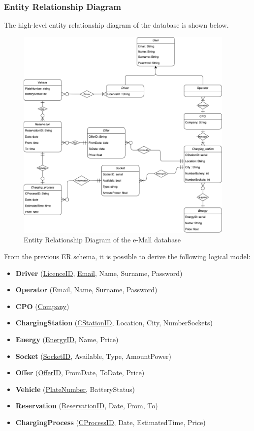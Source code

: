 \documentclass[../main.tex]{subfiles}
\begin{document}
\subsubsection{Entity Relationship Diagram}
The high-level entity relationship diagram of the database is shown below. 
\vspace{3em}
    {\begin{figure}[H]
    \centering
    \includegraphics[width=0.95\textwidth]{images/ERDiagram.png}
    \caption{Entity Relationship Diagram of the e-Mall database}
    \label{fig:er}
    \end{figure}}
    
\newpage
\noindent
From the previous ER schema, it is possible to derive the following logical model: 
\begin{itemize}
    \item [] \textbf{Driver} (\underline{LicenceID}, \underline{Email}, Name, Surname, Password)
    \item [] \textbf{Operator} (\underline{Email}, Name, Surname, Password)
    \item [] \textbf{CPO} (\underline{Company})
    \item [] \textbf{ChargingStation} (\underline{CStationID}, Location, City, NumberSockets)
    \item [] \textbf{Energy} (\underline{EnergyID}, Name, Price)
    \item [] \textbf{Socket} (\underline{SocketID}, Available, Type, AmountPower)
    \item [] \textbf{Offer} (\underline{OfferID}, FromDate, ToDate, Price)
    
    \item [] \textbf{Vehicle} (\underline{PlateNumber}, BatteryStatus)
    \item [] \textbf{Reservation} (\underline{ReservationID}, Date, From, To)
    \item [] \textbf{ChargingProcess} (\underline{CProcessID}, Date, EstimatedTime, Price)
\end{itemize}
\end{document}
